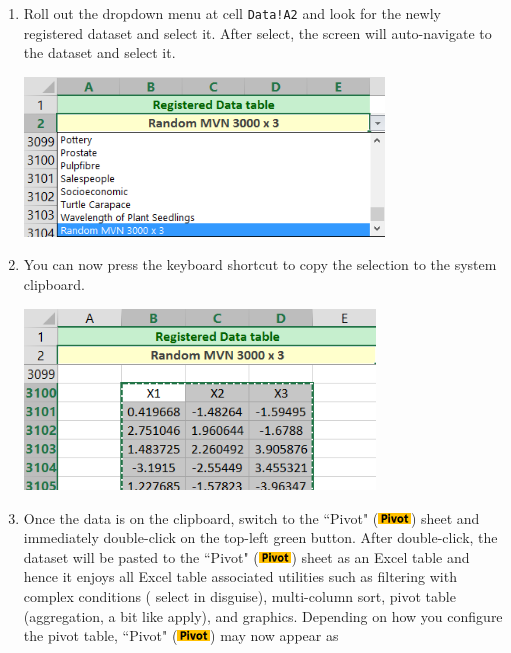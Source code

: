 \documentclass[article]{jss}
\numberwithin{equation}{subsection}
\newcommand{\shtPivot}{``Pivot" (\includegraphics[height=8pt, keepaspectratio=true]{PivotSheetTab_png}) }
\begin{document}
\begin{enumerate}
\begin{center}
        \end{center}
        \item Roll out the dropdown menu at cell \texttt{Data!A2} and look for the newly registered dataset and select it. After select, the screen will auto-navigate to the dataset and select it.
        \begin{center}
	        \vspace{-10pt}\includegraphics[height=120pt, keepaspectratio=true]{DataSheet_LocateDatasetViaMenu_png}\vspace{-10pt}
        \end{center}
        \item You can now press the keyboard shortcut to copy the selection to the system clipboard.
        \begin{center}
	        \vspace{-10pt}\includegraphics[height=136pt,keepaspectratio=true]{DataSheet_CopyDataset_png}\vspace{-10pt}
        \end{center}
        \item Once the data is on the clipboard, switch to the \shtPivot sheet and immediately double-click on the top-left green button. After double-click, the dataset will be pasted to the \shtPivot sheet as an Excel table and hence it enjoys all Excel table associated utilities such as filtering with complex conditions ( select in disguise), multi-column sort, pivot table (aggregation, a bit like  apply), and graphics. Depending on how you configure the pivot table, \shtPivot may now appear as
        \begin{center}

\end{center}
\end{enumerate}
\end{document}
